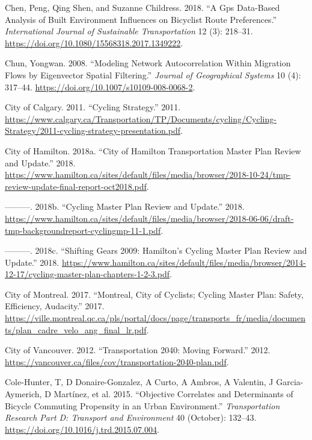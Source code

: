 \documentclass[smallextended]{svjour3}       %
\begin{document}
\leavevmode\hypertarget{ref-Chen2018}{}%
Chen, Peng, Qing Shen, and Suzanne Childress. 2018. ``A Gps Data-Based
Analysis of Built Environment Influences on Bicyclist Route
Preferences.'' \emph{International Journal of Sustainable
Transportation} 12 (3): 218--31.
\url{https://doi.org/10.1080/15568318.2017.1349222}.

\leavevmode\hypertarget{ref-Chun2008}{}%
Chun, Yongwan. 2008. ``Modeling Network Autocorrelation Within Migration
Flows by Eigenvector Spatial Filtering.'' \emph{Journal of Geographical
Systems} 10 (4): 317--44.
\url{https://doi.org/10.1007/s10109-008-0068-2}.

\leavevmode\hypertarget{ref-Calgary2011}{}%
City of Calgary. 2011. ``Cycling Strategy.'' 2011.
\url{https://www.calgary.ca/Transportation/TP/Documents/cycling/Cycling-Strategy/2011-cycling-strategy-presentation.pdf}.

\leavevmode\hypertarget{ref-Tmp2018}{}%
City of Hamilton. 2018a. ``City of Hamilton Transportation Master Plan
Review and Update.'' 2018.
\url{https://www.hamilton.ca/sites/default/files/media/browser/2018-10-24/tmp-review-update-final-report-oct2018.pdf}.

\leavevmode\hypertarget{ref-Cmp2018}{}%
---------. 2018b. ``Cycling Master Plan Review and Update.'' 2018.
\url{https://www.hamilton.ca/sites/default/files/media/browser/2018-06-06/draft-tmp-backgroundreport-cyclingmp-11-1.pdf}.

\leavevmode\hypertarget{ref-Cmp2009}{}%
---------. 2018c. ``Shifting Gears 2009: Hamilton's Cycling Master Plan
Review and Update.'' 2018.
\url{https://www.hamilton.ca/sites/default/files/media/browser/2014-12-17/cycling-master-plan-chapters-1-2-3.pdf}.

\leavevmode\hypertarget{ref-Montreal2017}{}%
City of Montreal. 2017. ``Montreal, City of Cyclists; Cycling Master
Plan: Safety, Efficiency, Audacity.'' 2017.
\url{https://ville.montreal.qc.ca/pls/portal/docs/page/transports_fr/media/documents/plan_cadre_velo_ang_final_lr.pdf}.

\leavevmode\hypertarget{ref-Vancouver2012}{}%
City of Vancouver. 2012. ``Transportation 2040: Moving Forward.'' 2012.
\url{https://vancouver.ca/files/cov/transportation-2040-plan.pdf}.

\leavevmode\hypertarget{ref-ColeHunter2015}{}%
Cole-Hunter, T, D Donaire-Gonzalez, A Curto, A Ambros, A Valentin, J
Garcia-Aymerich, D Martínez, et al. 2015. ``Objective Correlates and
Determinants of Bicycle Commuting Propensity in an Urban Environment.''
\emph{Transportation Research Part D: Transport and Environment} 40
(October): 132--43. \url{https://doi.org/10.1016/j.trd.2015.07.004}.
\end{document}
